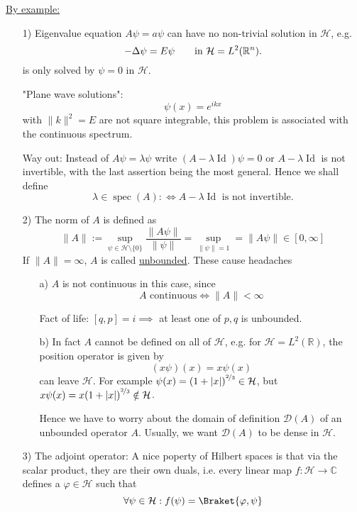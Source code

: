 \documentclass[12pt]{article}
\numberwithin{equation}{section}
\theoremstyle{plain}
\theoremstyle{plain}
\renewcommand{\phi}{\varphi}
\DeclareMathOperator{\id}{Id}
\DeclareMathOperator{\spec}{spec}
\begin{document}
\underline{By example:}
\begin{enumerate}
	\item[1)] Eigenvalue equation $A\psi = a \psi$ can have no non-trivial solution in $\mathcal H$, e.g.
	\[
		- \Delta \psi = E \psi \qquad \text{in  } \mathcal H = L^2 \mleft( \mathbb{R}^n \mright).	
	\]
	is only solved by $\psi = 0$ in $\mathcal H$.
	
	"Plane wave solutions":
	\[
		\psi(x) = e^{i k x}	
	\]
	with $\|k\|^2 = E$ are not square integrable, this problem is associated with the continuous spectrum.
	
	Way out: Instead of $A \psi = \lambda \psi$ write $(A - \lambda \id)\psi = 0 $
	or $A-\lambda \id $ is not invertible, with the last assertion being the most general. Hence we shall define
	\[
		\lambda \in \spec(A) :\iff A- \lambda \id \text{ is not invertible}.
	\]
	
	\item[2)] The norm of $A$ is defined as 
	\[
		\|A\|:= \sup_{\psi \in \mathcal H \setminus \{0\}}	\frac{\|A\psi\|}{\|\psi\|} = \sup_{\|\psi\| = 1} = \| A \psi\| \in [0,\infty]
	\]
	If $\|A\| = \infty$, $A$ is called \underline{unbounded}. These cause headaches
	\begin{enumerate}
	
	
	\item[a)] $A$ is not continuous in this case, since
	\[
		A \text{ continuous} \iff \|A\|< \infty	
	\]
	
	Fact of life: $[q,p] = i \implies$ at least one of $p,q$ is unbounded.
	
	\item[b)] In fact $A$ cannot be defined on all of $\mathcal H$, e.g. for $\mathcal H = L^2(\mathbb{R})$, the position operator is given by 
	\[
		(x\psi)(x) = x\psi(x)	
	\]
	can leave $\mathcal H$. For example $\psi(x) = \mleft(1+|x| \mright)^{\nicefrac{2}{3}} \in \mathcal H$, but $x \psi(x) = x \mleft(1+|x| \mright)^{\nicefrac{2}{3}} \notin \mathcal H$.
	
	Hence we have to worry about the domain of definition $\mathcal D(A)$ of an unbounded operator $A$.
	Usually, we want $\mathcal D(A)$ to be dense in $\mathcal H$.
	
	
	\end{enumerate}
	
	\item[3)] The adjoint operator: A nice poperty of Hilbert spaces is that via the scalar product, they are their own duals, i.e. every linear map $f: \mathcal H \rightarrow \mathbb{C}$ defines a $\phi \in \mathcal H$ such that 
	\[
		\forall \psi \in \mathcal H : f(\psi) = \Braket{\phi,\psi}	
	\]
	

\end{enumerate}
\end{document}
